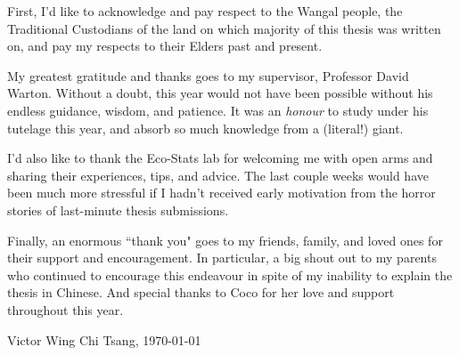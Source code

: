 
{\bigskip} First, I'd like to acknowledge and pay respect to the Wangal people, the Traditional Custodians of the land on which majority of this thesis was written on, and pay my respects to their Elders past and present.

{\bigskip} My greatest gratitude and thanks goes to my supervisor, Professor David Warton. Without a doubt, this year would not have been possible without his endless guidance, wisdom, and patience. It was an \textit{honour} to study under his tutelage this year, and absorb so much knowledge from a (literal!) giant.

{\bigskip} I'd also like to thank the Eco-Stats lab for welcoming me with open arms and sharing their experiences, tips, and advice. The last couple weeks would have been much more stressful if I hadn't received early motivation from the horror stories of last-minute thesis submissions.

{\bigskip} Finally, an enormous ``thank you" goes to my friends, family, and loved ones for their support and encouragement. In particular, a big shout out to my parents who continued to encourage this endeavour in spite of my inability to explain the thesis in Chinese. And special thanks to Coco for her love and support throughout this year.

{\bigskip\bigskip\bigskip}Victor Wing Chi Tsang, \today